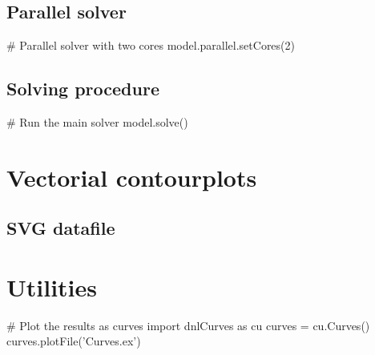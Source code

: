 \subsection{Parallel solver}

\begin{PythonListing}
# Parallel solver with two cores
model.parallel.setCores(2)
\end{PythonListing}

\subsection{Solving procedure}

\begin{PythonListing}
# Run the main solver
model.solve()
\end{PythonListing}

\section{Vectorial contourplots}

\subsection{SVG datafile}

\section{Utilities}

\begin{PythonListing}
# Plot the results as curves
import dnlCurves as cu
curves = cu.Curves()
curves.plotFile('Curves.ex')
\end{PythonListing}

